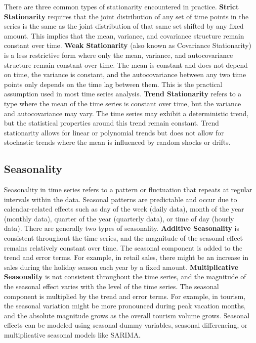 \documentclass[11pt,a4paper]{article}
\begin{document}
There are three common types of stationarity encountered in practice. \textbf{Strict Stationarity} requires that the joint distribution of any set of time points in the series is the same as the joint distribution of that same set shifted by any fixed amount. This implies that the mean, variance, and covariance structure remain constant over time. \textbf{Weak Stationarity} (also known as Covariance Stationarity) is a less restrictive form where only the mean, variance, and autocovariance structure remain constant over time. The mean is constant and does not depend on time, the variance is constant, and the autocovariance between any two time points only depends on the time lag between them. This is the practical assumption used in most time series analysis. \textbf{Trend Stationarity} refers to a type where the mean of the time series is constant over time, but the variance and autocovariance may vary. The time series may exhibit a deterministic trend, but the statistical properties around this trend remain constant. Trend stationarity allows for linear or polynomial trends but does not allow for stochastic trends where the mean is influenced by random shocks or drifts.

\subsection{Seasonality}

Seasonality in time series refers to a pattern or fluctuation that repeats at regular intervals within the data. Seasonal patterns are predictable and occur due to calendar-related effects such as day of the week (daily data), month of the year (monthly data), quarter of the year (quarterly data), or time of day (hourly data). There are generally two types of seasonality. \textbf{Additive Seasonality} is consistent throughout the time series, and the magnitude of the seasonal effect remains relatively constant over time. The seasonal component is added to the trend and error terms. For example, in retail sales, there might be an increase in sales during the holiday season each year by a fixed amount. \textbf{Multiplicative Seasonality} is not consistent throughout the time series, and the magnitude of the seasonal effect varies with the level of the time series. The seasonal component is multiplied by the trend and error terms. For example, in tourism, the seasonal variation might be more pronounced during peak vacation months, and the absolute magnitude grows as the overall tourism volume grows. Seasonal effects can be modeled using seasonal dummy variables, seasonal differencing, or multiplicative seasonal models like SARIMA.
\end{document}
